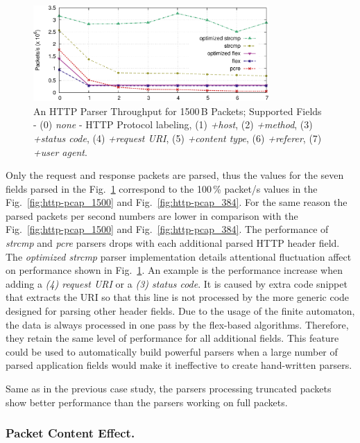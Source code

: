 \begin{figure}[tb]
    \centering
    \includegraphics[width=0.8\textwidth]{figures/paper-http/mod_1500}
    \caption{An HTTP Parser Throughput for 1500\,B Packets; Supported Fields - (0) \emph{none} - HTTP Protocol labeling, (1) \emph{+host}, (2) \emph{+method}, (3) \emph{+status code}, (4) \emph{+request URI}, (5) \emph{+content type}, (6) \emph{+referer}, (7) \emph{+user agent}.} 
    \label{fig:http-field}
\end{figure}


Only the request and response packets are parsed, thus the values for the seven fields parsed in the Fig.~\ref{fig:http-field} correspond to the 100\,\% packet/s values in the Fig.~\ref{fig:http-pcap_1500} and Fig.~\ref{fig:http-pcap_384}. For the same reason the parsed packets per second numbers are lower in comparison with the Fig.~\ref{fig:http-pcap_1500} and Fig.~\ref{fig:http-pcap_384}. The performance of \emph{strcmp} and \emph{pcre} parsers drops with each additional parsed HTTP header field. The \emph{optimized strcmp} parser implementation details attentional fluctuation affect on performance shown in Fig.~\ref{fig:http-field}. An example is the performance increase when adding a \emph{(4) request URI} or a \emph{(3) status code}. It is caused by extra code snippet that extracts the URI so that this line is not processed by the more generic code designed for parsing other header fields. Due to the usage of the finite automaton, the data is always processed in one pass by the flex-based algorithms. Therefore, they retain the same level of performance for all additional fields. This feature could be used to automatically build powerful parsers when a large number of parsed application fields would make it ineffective to create hand-written parsers.

Same as in the previous case study, the parsers processing truncated packets show better performance than the parsers working on full packets.

\subsubsection*{Packet Content Effect.}

